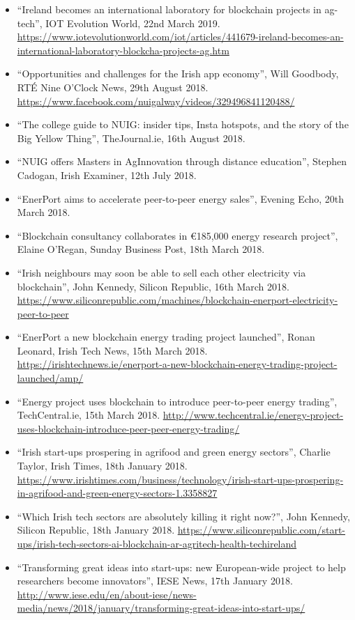 \documentclass[10pt,a4paper]{res} %
\begin{document}
\begin{resume}
{\begin{itemize}
\item ``Ireland becomes an international laboratory for blockchain projects in ag-tech'', IOT Evolution World, 22nd March 2019. \url{https://www.iotevolutionworld.com/iot/articles/441679-ireland-becomes-an-international-laboratory-blockcha-projects-ag.htm}
\item ``Opportunities and challenges for the Irish app economy'', Will Goodbody, RT\'{E} Nine O'Clock News, 29th August 2018. \url{https://www.facebook.com/nuigalway/videos/329496841120488/}
\item ``The college guide to NUIG: insider tips, Insta hotspots, and the story of the Big Yellow Thing'', TheJournal.ie, 16th August 2018.
\item ``NUIG offers Masters in AgInnovation through distance education'', Stephen Cadogan, Irish Examiner, 12th July 2018.
\item ``EnerPort aims to accelerate peer-to-peer energy sales'', Evening Echo, 20th March 2018.
\item ``Blockchain consultancy collaborates in \euro{}185,000 energy research project'', Elaine O'Regan, Sunday Business Post, 18th March 2018.
\item ``Irish neighbours may soon be able to sell each other electricity via blockchain'', John Kennedy, Silicon Republic, 16th March 2018. \url{https://www.siliconrepublic.com/machines/blockchain-enerport-electricity-peer-to-peer}
\item ``EnerPort a new blockchain energy trading project launched'', Ronan Leonard, Irish Tech News, 15th March 2018. \url{https://irishtechnews.ie/enerport-a-new-blockchain-energy-trading-project-launched/amp/}
\item ``Energy project uses blockchain to introduce peer-to-peer energy trading'', TechCentral.ie, 15th March 2018. \url{http://www.techcentral.ie/energy-project-uses-blockchain-introduce-peer-peer-energy-trading/}
\item ``Irish start-ups prospering in agrifood and green energy sectors'', Charlie Taylor, Irish Times, 18th January 2018. \url{https://www.irishtimes.com/business/technology/irish-start-ups-prospering-in-agrifood-and-green-energy-sectors-1.3358827}
\item ``Which Irish tech sectors are absolutely killing it right now?'', John Kennedy, Silicon Republic, 18th January 2018. \url{https://www.siliconrepublic.com/start-ups/irish-tech-sectors-ai-blockchain-ar-agritech-health-techireland}
\item ``Transforming great ideas into start-ups: new European-wide project to help researchers become innovators'', IESE News, 17th January 2018. \url{http://www.iese.edu/en/about-iese/news-media/news/2018/january/transforming-great-ideas-into-start-ups/}

\end{itemize}}
\end{resume}
\end{document}
